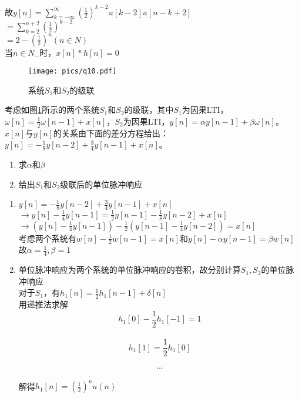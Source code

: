 \documentclass[answers]{exam}
\begin{document}
\begin{questions}
\begin{solution}
	故$y[n]=\sum_{k=-\infty}^{\infty}(\frac{1}{2})^{k-2}u[k-2]u[n-k+2]$\\

	$=\sum_{k=2}^{n+2}(\frac{1}{2})^{k-2}$\\

	$=2-(\frac{1}{2})^n(n\in N)$\\

	当$n\in N_-$时，$x[n]*h[n]=0$\\

\end{solution} 



\begin{figure}
	\centering
	\texttt{[image: pics/q10.pdf]}
	\caption{系统$S_1$和$S_2$的级联} \label{fig:q10-1}
\end{figure}
\question 考虑如图\ref{fig:q10-1}所示的两个系统$S_1$和$S_2$的级联，其中$S_1$为因果LTI，$\omega[n]=\frac{1}{2}\omega[n-1]+x[n]$，$S_2$为因果LTI，$y[n]=\alpha y[n-1]+\beta \omega[n]$。$x[n]$与$y[n]$的关系由下面的差分方程给出：$y[n]=-\frac{1}{8}y[n-2]+\frac{3}{4}y[n-1]+x[n]$。
\begin{enumerate}[(1)]
	\item 求$\alpha$和$\beta$
	\item 给出$S_1$和$S_2$级联后的单位脉冲响应
\end{enumerate}

\begin{solution}
\begin{enumerate}[(1)]
	\item $y[n]=-\frac{1}{8}y[n-2]+\frac{3}{4}y[n-1]+x[n]$\\
	$\rightarrow y[n]-\frac{1}{4}y[n-1]=\frac{1}{2}y[n-1]-\frac{1}{8}y[n-2]+x[n]$\\
	$\rightarrow (y[n]-\frac{1}{4}y[n-1])-\frac{1}{2}(y[n-1]-\frac{1}{4}y[n-2])=x[n]$\\

	考虑两个系统有$w[n]-\frac{1}{2}w[n-1]=x[n]$和$y[n]-\alpha y[n-1]=\beta w[n]$\\
	故$\alpha=\frac{1}{4},\beta=1$

	\item 单位脉冲响应为两个系统的单位脉冲响应的卷积，故分别计算$S_1,S_2$的单位脉冲响应\\
	对于$S_1$，有$h_1[n]=\frac{1}{2}h_1[n-1]+\delta[n]$\\
	用递推法求解\\
	$$
	h_1[0]-\frac{1}{2}h_1[-1]=1$$
	\\$$
	h_1[1]=\frac{1}{2}h_1[0]$$\\$$
	...
	$$\\
	解得$h_1[n]=(\frac{1}{2})^nu(n)$\\


\end{enumerate}
\end{solution}
\end{questions}
\end{document}
